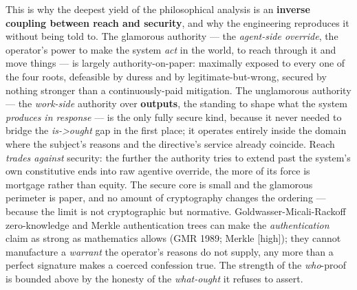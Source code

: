 \documentclass[11pt]{article}
\begin{document}
This is why the deepest yield of the philosophical analysis is an \textbf{inverse coupling between reach and security}, and why the engineering reproduces it without being told to. The glamorous authority — the \emph{agent-side override}, the operator's power to make the system \emph{act} in the world, to reach through it and move things — is largely authority-on-paper: maximally exposed to every one of the four roots, defeasible by duress and by legitimate-but-wrong, secured by nothing stronger than a continuously-paid mitigation. The unglamorous authority — the \emph{work-side} authority over \textbf{outputs}, the standing to shape what the system \emph{produces in response} — is the only fully secure kind, because it never needed to bridge the \emph{is->ought} gap in the first place; it operates entirely inside the domain where the subject's reasons and the directive's service already coincide. Reach \emph{trades against} security: the further the authority tries to extend past the system's own constitutive ends into raw agentive override, the more of its force is mortgage rather than equity. The secure core is small and the glamorous perimeter is paper, and no amount of cryptography changes the ordering — because the limit is not cryptographic but normative. Goldwasser-Micali-Rackoff zero-knowledge and Merkle authentication trees can make the \emph{authentication} claim as strong as mathematics allows (GMR 1989; Merkle [high]); they cannot manufacture a \emph{warrant} the operator's reasons do not supply, any more than a perfect signature makes a coerced confession true. The strength of the \emph{who}-proof is bounded above by the honesty of the \emph{what-ought} it refuses to assert.
\end{document}
